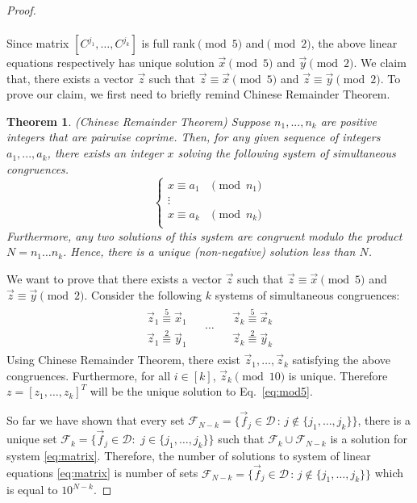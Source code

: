 \documentclass{article}
\newtheorem{theorem}{Theorem}
\newcommand{\transp}[1]{#1^T}
\begin{document}
\begin{proof}
\begin{equation}
\begin{array}{l}
 
 \end{array} 
  \end{equation}
 
Since matrix $[C^{j_1},\ldots,C^{j_k}]$ is full rank$\pmod{5}$ and$\pmod{2}$, the above linear equations respectively has unique solution $\vec{x}\pmod{5}$ and $\vec{y}\pmod{2}$. We claim that, there exists a vector $\vec{z}$ such that $\vec{z}\equiv\vec{x}\pmod{5}$ and $\vec{z}\equiv\vec{y}\pmod{2}$. To prove our claim, we first need to briefly remind Chinese Remainder Theorem.

\begin{theorem}(Chinese Remainder Theorem)
\label{chinese}
Suppose $n_1, ..., n_k$ are positive integers that are pairwise coprime. Then, for any given sequence of integers $a_1, ..., a_k$, there exists an integer $x$ solving the following system of simultaneous congruences.
$$
\left\{ \begin{array}{cl}
     x \equiv a_1 &\pmod{n_1} \\
      \vdots &\\
      x \equiv a_k &\pmod{n_k} \\
\end{array} \right.		
$$
Furthermore, any two solutions of this system are congruent modulo the product $N = n_1 \ldots n_k$. Hence, there is a unique (non-negative) solution less than $N$.
\end{theorem}

We want to prove that there exists a vector $\vec{z}$ such that $\vec{z}\equiv\vec{x}\pmod{5}$ and $\vec{z}\equiv\vec{y}\pmod{2}$. Consider the following $k$ systems of simultaneous congruences:
$$
\begin{array}{lcr}
\begin{array}{l}
\vec{z}_1\overset{5}{\equiv} \vec{x}_1\\
\vec{z}_1\overset{2}{\equiv} \vec{y}_1
\end{array} &
\begin{array}{c}
\ldots
\end{array}&
\begin{array}{r}
\vec{z}_k\overset{5}{\equiv} \vec{x}_k\\
\vec{z}_k\overset{2}{\equiv} \vec{y}_k
\end{array}
	
\end{array}
$$
Using Chinese Remainder Theorem, there exist $\vec{z}_1,\ldots,\vec{z}_k$ satisfying the above congruences. Furthermore, for all $i\in[k]$, $\vec{z}_k\pmod{10}$ is unique. Therefore $z=[z_1,\ldots,z_k]\transp{}$ will be the unique solution to Eq.~\ref{eq:mod5}. 


So far we have shown that every set $\mathcal{F}_{N-k}=\{\vec{f}_j\in\mathcal{D}\, : \, j \notin \{j_1,\ldots,j_k\} \}$, there is a unique set $\mathcal{F}_k=\{\vec{f}_j\in\mathcal{D}:\,\, j\in\{j_1,\ldots,j_k\}\}$ such that $\mathcal{F}_k \cup\mathcal{F}_{N-k}$ is a solution for system \ref{eq:matrix}. Therefore, the number of solutions to system of linear equations \ref{eq:matrix} is number of sets $\mathcal{F}_{N-k}=\{\vec{f}_j\in\mathcal{D}\, : \, j \notin \{j_1,\ldots,j_k\} \}$ which is equal to $10^{N-k}$.
\end{proof}
\end{document}
